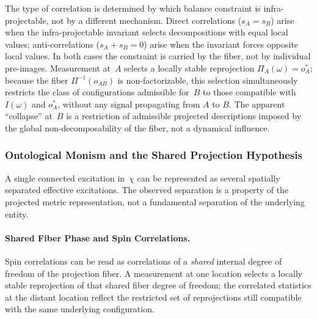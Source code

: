   The type of correlation is determined by which balance constraint is
  infra-projectable, not by a different mechanism.
  Direct correlations ($s_A = s_B$) arise when the infra-projectable
  invariant selects decompositions with equal local values;
  anti-correlations ($s_A + s_B = 0$) arise when the invariant forces
  opposite local values.
  In both cases the constraint is carried by the fiber, not by individual
  pre-images.
  Measurement at~$A$ selects a locally stable reprojection
  $\Pi_A(\omega) = o_A^*$; because the fiber $\Pi^{-1}(o_{AB})$ is
  non-factorizable, this selection simultaneously restricts the class of
  configurations admissible for~$B$ to those compatible with $I(\omega)$
  and $o_A^*$, without any signal propagating from $A$ to $B$.
  The apparent ``collapse'' at~$B$ is a restriction of admissible projected
  descriptions imposed by the global non-decomposability of the fiber, not a
  dynamical influence.

  \subsubsection*{Ontological Monism and the Shared Projection Hypothesis}
    \label{subsec:ontological-monism-shared-projection}

    A single connected excitation in~$\chi$ can be represented as several
    spatially separated effective excitations.
    The observed separation is a property of the projected metric
    representation, not a fundamental separation of the underlying entity.

    \paragraph{Shared Fiber Phase and Spin Correlations.}
      \label{subsec:shared-fiber-phase-spin}
      Spin correlations can be read as correlations of a \emph{shared}
      internal degree of freedom of the projection fiber.
      A measurement at one location selects a locally stable reprojection of
      that shared fiber degree of freedom; the correlated statistics at the
      distant location reflect the restricted set of reprojections still
      compatible with the same underlying configuration.

